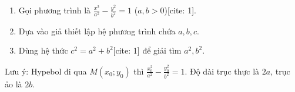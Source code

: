 \begin{enumerate}
\item Gọi phương trình là $\frac{x^2}{a^2} - \frac{y^2}{b^2} = 1$ ($a, b > 0$)[cite: 1].
\item Dựa vào giả thiết lập hệ phương trình chứa $a, b, c$.
\item Dùng hệ thức $c^2 = a^2 + b^2$[cite: 1] để giải tìm $a^2, b^2$.
\end{enumerate}
Lưu ý: Hypebol đi qua $M(x_0; y_0)$ thì $\frac{x_0^2}{a^2} - \frac{y_0^2}{b^2} = 1$. Độ dài trục thực là $2a$, trục ảo là $2b$.
